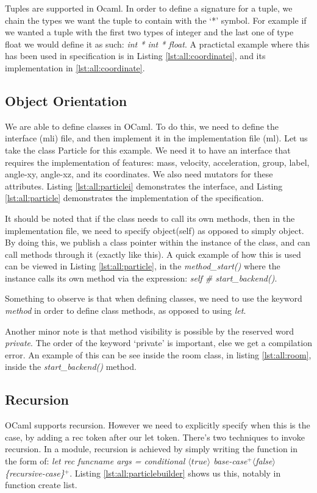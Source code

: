 Tuples are supported in Ocaml. In order to define a signature for a tuple, we
chain the types we want the tuple to contain with the ‘*’ symbol. For example
if we wanted a tuple with the first two types of integer and the last one of
type float we would define it as such: \textit{int * int * float}. A practictal
example where this has been used in specification is in Listing
\ref{lst:all:coordinatei}, and its implementation in
\ref{lst:all:coordinate}.

\subsection{Object Orientation}

We are able to define classes in OCaml. To do this, we need to define the
interface (mli) file, and then implement it in the implementation file (ml).
Let us take the class Particle for this example. We need it to have an
interface that requires the implementation of features: mass, velocity,
acceleration, group, label, angle-xy, angle-xz, and its coordinates. We also
need mutators for these attributes. Listing \ref{lst:all:particlei} demonstrates
the interface, and Listing \ref{lst:all:particle} demonstrates the
implementation of the specification.

It should be noted that if the class needs to call its own methods, then in the
implementation file, we need to specify object(self) as opposed to simply
object. By doing this, we publish a class pointer within the instance of the
class, and can call methods through it (exactly like this). A quick example of
how this is used can be viewed in Listing \ref{lst:all:particle}, in the
\textit{method\_start()} where the instance calls its own method via the
expression: \textit{self \# start\_backend()}.

Something to observe is that when defining classes, we need to use the keyword
\textit{method } in order to define class methods, as opposed to using \textit{let}.

Another minor note is that method visibility is possible by the reserved word
\textit{private}. The order of the keyword `private' is important, else we get a
compilation error. An example of this can be see inside the room class, in 
listing \ref{lst:all:room}, inside the \textit{start\_backend()} method.

\subsection{Recursion}
OCaml supports recursion. However we need to explicitly specify when this is
the case, by adding a rec token after our let token. There’s two techniques to
invoke recursion. In a module, recursion is achieved by simply writing the
function in the form of: \textit{let rec funcname args = conditional $\langle
true \rangle$ {base-case}$^{+}$$\langle$false$\rangle$
\{recursive-case\}$^{+}$}. Listing \ref{lst:all:particlebuilder} shows us this,
notably in function create list.  

